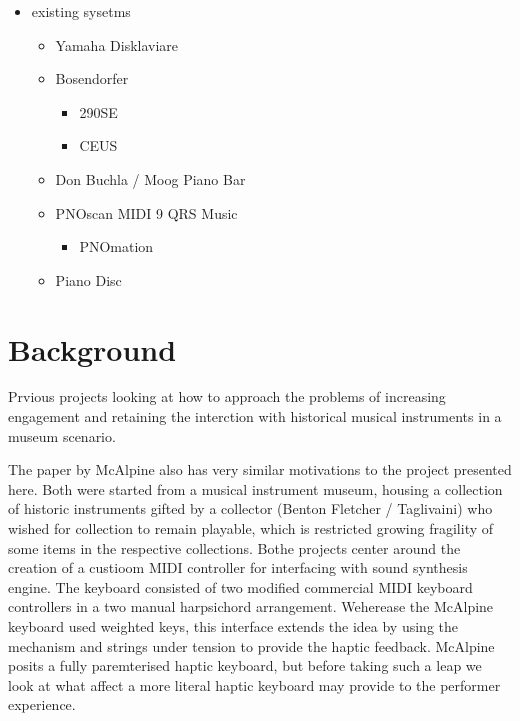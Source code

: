 \begin{itemize}
\tightlist
\item
  existing sysetms

  \begin{itemize}
  \tightlist
  \item
    Yamaha Disklaviare
  \item
    Bosendorfer

    \begin{itemize}
    \tightlist
    \item
      290SE
    \item
      CEUS
    \end{itemize}
  \item
    Don Buchla / Moog Piano Bar
  \item
    PNOscan MIDI 9 QRS Music

    \begin{itemize}
    \tightlist
    \item
      PNOmation
    \end{itemize}
  \item
    Piano Disc
  \end{itemize}
\end{itemize}

\section{Background}\label{background}

Prvious projects looking at how to approach the problems of increasing
engagement and retaining the interction with historical musical
instruments in a museum scenario.

The paper by McAlpine \cite{McAlpine2014} also has very similar
motivations to the project presented here. Both were started from a
musical instrument museum, housing a collection of historic instruments
gifted by a collector (Benton Fletcher / Taglivaini) who wished for
collection to remain playable, which is restricted growing fragility of
some items in the respective collections. Bothe projects center around
the creation of a custioom MIDI controller for interfacing with sound
synthesis engine. The keyboard consisted of two modified commercial MIDI
keyboard controllers in a two manual harpsichord arrangement. Weherease
the McAlpine keyboard used weighted keys, this interface extends the
idea by using the mechanism and strings under tension to provide the
haptic feedback. McAlpine posits a fully paremterised haptic keyboard,
but before taking such a leap we look at what affect a more literal
haptic keyboard may provide to the performer experience.

